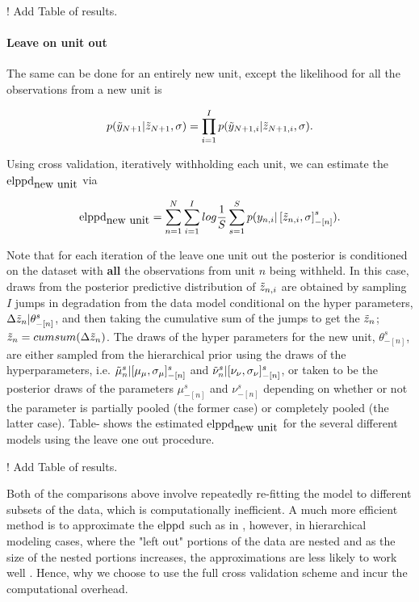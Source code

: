 ! Add Table of results.

\paragraph{Leave on unit out} 

The same can be done for an entirely new unit, except the likelihood for all the observations from a new unit is

\begin{equation} \label{ep:likelihood_new_unit}
   p(\Tilde{y}_{N + 1}|\Tilde{z}_{N + 1}, \sigma) = \prod^I_{i = 1} p(\Tilde{y}_{N + 1, i}|\Tilde{z}_{N + 1, i}, \sigma).
\end{equation}

Using cross validation, iteratively withholding each unit, we can estimate the $\hbox{elppd}_{\hbox{new unit}}$ via

\begin{equation} \label{ep:elppd_loo_sa}
   \hbox{elppd}_{\hbox{new unit}} = \sum^N_{n = 1}\sum^{I}_{i = 1} log \frac{1}{S} \sum^S_{s = 1} p(y_{n, i} | \left[\Tilde{z}_{n, i}, \sigma \right]_{-\left[ n \right]}^s).
\end{equation}

Note that for each iteration of the leave one unit out the posterior is conditioned on the dataset with \textbf{all} the observations from unit $n$ being withheld. In this case, draws from the posterior predictive distribution of $\Tilde{z}_{n, i}$ are obtained by sampling $I$ jumps in degradation from the data model conditional on the hyper parameters, $\Delta \Tilde{z}_{n}|\theta^s_{-[n]}$, and then taking the cumulative sum of the jumps to get the $\Tilde{z}_{n}$; $\Tilde{z}_{n} = cumsum(\Delta \Tilde{z}_{n})$. The draws of the hyper parameters for the new unit, $\theta^s_{-[n]}$, are either sampled from the hierarchical prior using the draws of the hyperparameters, i.e. $\Tilde{\mu}^s_{n}|[\mu_{\mu}, \sigma_{\mu}]^s_{-[n]}$ and $\Tilde{\nu}^s_{n}|[\nu_{\nu}, \sigma_{\nu}]^s_{-[n]}$, or taken to be the posterior draws of the parameters $\mu^s_{-[n]}$ and $\nu^s_{-[n]}$ depending on whether or not the parameter is partially pooled (the former case) or completely pooled (the latter case). Table- shows the estimated $\hbox{elppd}_{\hbox{new unit}}$ for the several different models using the leave one out procedure.

! Add Table of results.

Both of the comparisons above involve repeatedly re-fitting the model to different subsets of the data, which is computationally inefficient. A much more efficient method is to approximate the $\hbox{elppd}$ such as in \citet{Vehtari2017}, however, in hierarchical modeling cases, where the "left out" portions of the data are nested and as the size of the nested portions increases, the approximations are less likely to work well \citep{Vehtari2017}. Hence, why we choose to use the full cross validation scheme and incur the computational overhead.

